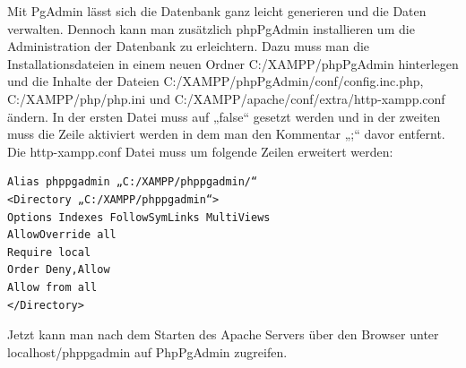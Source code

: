 Mit PgAdmin lässt sich die Datenbank ganz leicht generieren und die Daten verwalten. Dennoch kann man zusätzlich phpPgAdmin installieren um die Administration der Datenbank zu erleichtern.\cite{PostgreSQLVerwaltungstools} Dazu muss man die Installationsdateien in einem neuen Ordner C:/XAMPP/phpPgAdmin hinterlegen und die Inhalte der Dateien C:/XAMPP/phpPgAdmin/conf/config.inc.php, C:/XAMPP/php/php.ini und C:/XAMPP/apache/conf/extra/http-xampp.conf ändern. In der ersten Datei muss  auf „false“ gesetzt werden und in der zweiten muss die Zeile  aktiviert werden in dem man den Kommentar „;“ davor entfernt. Die http-xampp.conf Datei muss um folgende Zeilen erweitert werden: 

\begin{verbatim}
Alias phppgadmin „C:/XAMPP/phppgadmin/“
<Directory „C:/XAMPP/phppgadmin“>
Options Indexes FollowSymLinks MultiViews
AllowOverride all
Require local
Order Deny,Allow
Allow from all
</Directory>
 \end{verbatim}

Jetzt kann man nach dem Starten des Apache Servers über den Browser unter localhost/phppgadmin auf PhpPgAdmin zugreifen.
